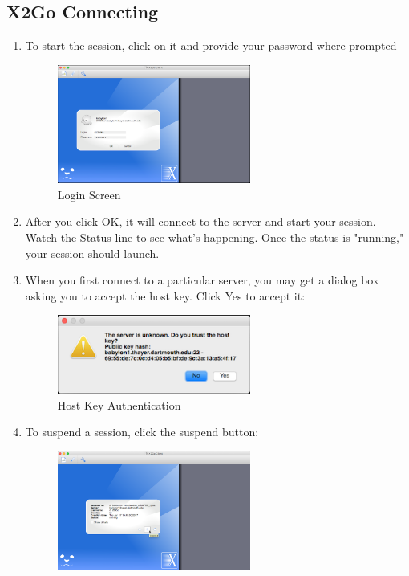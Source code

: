 \subsection{X2Go Connecting}
\begin{enumerate}[resume]
	\item To start the session, click on it and provide your password where prompted
\begin{figure}[!htb]
	\centering
	\includegraphics[width=0.6\textwidth]{src/images/image6.png}
	\caption{Login Screen}
	\label{fig:fig6}
\end{figure}
	\item After you click OK, it will connect to the server and start your session. Watch the Status line to see what's happening. Once the status is "running," your session should launch.
	\item When you first connect to a particular server, you may get a dialog box asking you to accept the host key. Click Yes to accept it:
\begin{figure}[!htb]
	\centering
	\includegraphics[width=0.6\textwidth]{src/images/image7.png}
	\caption{Host Key Authentication}
	\label{fig:fig7}
\end{figure}
	\item To suspend a session, click the suspend button:
\begin{figure}[!htb]
	\centering
	\includegraphics[width=0.6\textwidth]{src/images/image8.png}

\end{figure}
\end{enumerate}
